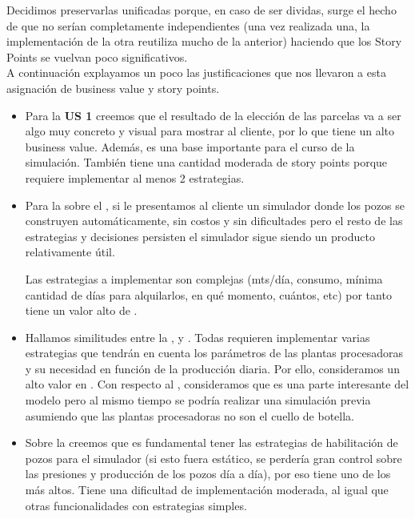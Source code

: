 Decidimos preservarlas unificadas porque, en caso de ser dividas, surge el hecho de que no serían completamente independientes (una vez realizada una, la implementación de la otra reutiliza mucho de la anterior) haciendo que los Story Points se vuelvan poco significativos.
\\

A continuación explayamos un poco las justificaciones que nos llevaron a esta asignación de business value y story points.

\begin{itemize}
  \item Para la \textbf{US 1} creemos que el resultado de la elección de las parcelas va a ser algo muy concreto y visual para mostrar al cliente, por lo que tiene un alto business value. Además, es una base importante para el curso de la simulación.
  También tiene una cantidad moderada de story points porque requiere implementar al menos 2 estrategias. 
	
    \item Para la  sobre el \BV, si le presentamos al cliente un simulador donde los pozos se construyen automáticamente, sin costos y sin dificultades pero el resto de las estrategias y decisiones persisten el simulador sigue siendo un producto relativamente útil.

	Las estrategias a implementar son complejas (mts/día, consumo, mínima cantidad de días para alquilarlos, en qué momento, cuántos, etc) por tanto tiene 
    un valor alto de \SP. 
    
	\item Hallamos similitudes entre la ,  y . Todas requieren implementar varias estrategias que tendrán en cuenta los parámetros de las plantas procesadoras y su necesidad en función de la producción diaria. Por ello, consideramos un alto valor en \SP. Con respecto al \BV, consideramos que es una parte interesante del modelo pero al mismo tiempo se podría realizar una simulación previa asumiendo que las plantas procesadoras no son el cuello de botella.
    
    \item Sobre la  creemos que es fundamental tener las estrategias de habilitación de pozos para el simulador (si esto fuera estático, se perdería gran control sobre las presiones y producción de los pozos día a día), por eso tiene uno de los \BV{} más altos. Tiene una dificultad de implementación moderada, al igual que otras funcionalidades con estrategias simples. 
    

\end{itemize}
